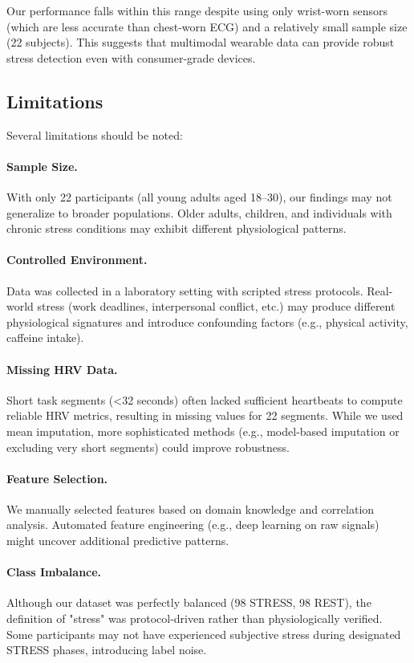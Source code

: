 \documentclass[12pt,letterpaper]{article}
\begin{document}
Our performance falls within this range despite using only wrist-worn sensors (which are less accurate than chest-worn ECG) and a relatively small sample size (22 subjects). This suggests that multimodal wearable data can provide robust stress detection even with consumer-grade devices.

\subsection{Limitations}

Several limitations should be noted:

\paragraph{Sample Size.} With only 22 participants (all young adults aged 18--30), our findings may not generalize to broader populations. Older adults, children, and individuals with chronic stress conditions may exhibit different physiological patterns.

\paragraph{Controlled Environment.} Data was collected in a laboratory setting with scripted stress protocols. Real-world stress (work deadlines, interpersonal conflict, etc.) may produce different physiological signatures and introduce confounding factors (e.g., physical activity, caffeine intake).

\paragraph{Missing HRV Data.} Short task segments (<32 seconds) often lacked sufficient heartbeats to compute reliable HRV metrics, resulting in missing values for 22 segments. While we used mean imputation, more sophisticated methods (e.g., model-based imputation or excluding very short segments) could improve robustness.

\paragraph{Feature Selection.} We manually selected features based on domain knowledge and correlation analysis. Automated feature engineering (e.g., deep learning on raw signals) might uncover additional predictive patterns.

\paragraph{Class Imbalance.} Although our dataset was perfectly balanced (98 STRESS, 98 REST), the definition of "stress" was protocol-driven rather than physiologically verified. Some participants may not have experienced subjective stress during designated STRESS phases, introducing label noise.
\end{document}
